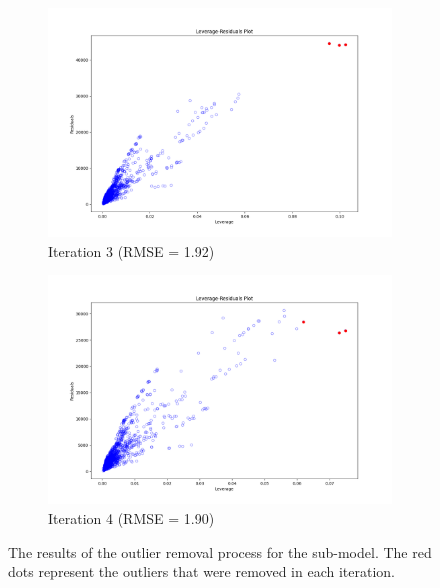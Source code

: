 \begin{figure}[h]
\begin{subfigure}{.5\textwidth}
    \centering
    \includegraphics[width=0.9\linewidth]{images/FeOT_Full_3.png}
    \caption{Iteration 3 (RMSE = 1.92)}
    \label{fig:iteration3}
\end{subfigure}%
\begin{subfigure}{.5\textwidth}
    \centering
    \includegraphics[width=0.9\linewidth]{images/FeOT_Full_4.png}
    \caption{Iteration 4 (RMSE = 1.90)}
    \label{fig:iteration4}
\end{subfigure}


\caption{The results of the outlier removal process for the  sub-model. The red dots represent the outliers that were removed in each iteration.}
\label{fig:FeOT_oxide_removal}
\end{figure}

